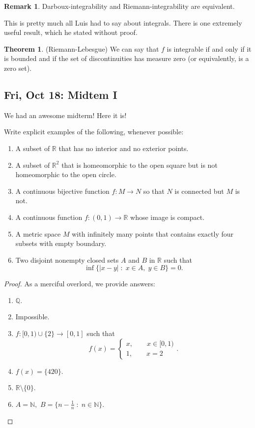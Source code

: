 \documentclass[10pt, oneside]{article}
\newcommand{\bbR}{\mathbb{R}}
\newcommand{\bbN}{\mathbb{N}}
\newcommand{\bbQ}{\mathbb{Q}}
\theoremstyle{definition}
\newtheorem{thm}{Theorem}
\newtheorem{rem}{Remark}
\begin{document}
\begin{rem}
    Darboux-integrability and Riemann-integrability are equivalent.
\end{rem}
This is pretty much all Luis had to say about integrals. There is one extremely useful result, which he stated without proof.
\begin{thm}
(Riemann-Lebesgue) We can say that $f$ is integrable if and only if it is bounded and if the set of discontinuities has measure zero (or equivalently, is a zero set).
\end{thm}


\newpage
\subsection{Fri, Oct 18: Midtem I}
We had an awesome midterm! Here it is!

Write explicit examples of the following, whenever possible:
\begin{enumerate}
    \item A subset of $\bbR$ that has no interior and no exterior points.
    \item A subset of $\bbR^2$ that is homeomorphic to the open square but is not homeomorphic to the open circle.
    \item A continuous bijective function $f: M \to N$ so that $N$ is connected but $M$ is not.
    \item A continuous function $f: (0,1)\to \bbR$ whose image is compact.
    \item A metric space $M$ with infinitely many points that contains exactly four subsets with empty boundary.
    \item Two disjoint nonempty closed sets $A$ and $B$ in $\bbR$ such that 
    \[\inf\{|x-y| \; : \; x \in A, \; y \in B\} = 0.\]
\end{enumerate}
\begin{proof}
    As a merciful overlord, we provide answers:
    \begin{enumerate}
        \item $\bbQ.$
        \item Impossible.
        \item $f:[0,1) \cup \{2\}\to [0,1]$ such that 
        \[f(x) = \begin{cases}
            x, \qquad x\in [0,1)\\
            1, \qquad x = 2
        \end{cases}.\]
        \item $f(x) = \{420\}.$
        \item $\bbR \setminus \{0\}.$
        \item $A = \bbN,$ $B = \{n - \frac{1}{n} \; : \; n \in \bbN\}.$
    \end{enumerate}
\end{proof}
\end{document}
